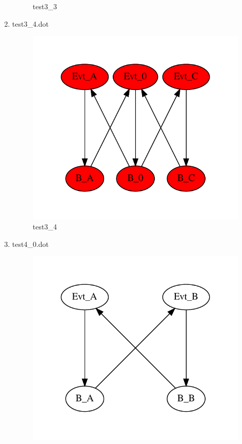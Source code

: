 \documentclass[12pt,a4paper]{report}
\begin{document}
\begin{enumerate}
\begin{figure}
        \caption{test3\_3}
        \label{fig:test3_3}
    \end{figure}
\item test3\_4.dot
    \begin{figure}
        \centering 
        \includegraphics*[width=1.0\textwidth,keepaspectratio]{TestPattern/test3_4.pdf}
        \caption{test3\_4}
        \label{fig:test3_4}
    \end{figure}
\item test4\_0.dot
    \begin{figure}
        \centering 
        \includegraphics*[width=1.0\textwidth,keepaspectratio]{TestPattern/test4_0.pdf}

\end{figure}
\end{enumerate}
\end{document}
